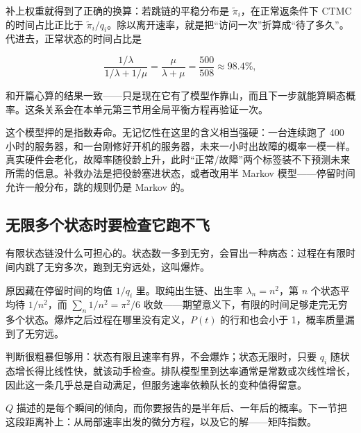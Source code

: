 补上权重就得到了正确的换算：若跳链的平稳分布是 \(\widetilde\pi_i\)，在正常返条件下 CTMC 的时间占比正比于 \(\widetilde\pi_i/q_i\)。除以离开速率，就是把``访问一次''折算成``待了多久''。代进去，正常状态的时间占比是

\[
\frac{1/\lambda}{1/\lambda+1/\mu}=\frac{\mu}{\lambda+\mu}=\frac{500}{508}\approx 98.4\%,
\]

和开篇心算的结果一致——只是现在它有了模型作靠山，而且下一步就能算瞬态概率。这条关系会在本单元第三节用全局平衡方程再验证一次。

这个模型押的是指数寿命。无记忆性在这里的含义相当强硬：一台连续跑了 400 小时的服务器，和一台刚修好开机的服务器，未来一小时出故障的概率一模一样。真实硬件会老化，故障率随役龄上升，此时``正常/故障''两个标签装不下预测未来所需的信息。补救办法是把役龄塞进状态，或者改用半 Markov 模型——停留时间允许一般分布，跳的规则仍是 Markov 的。

\subsection{无限多个状态时要检查它跑不飞}

有限状态链没什么可担心的。状态数一多到无穷，会冒出一种病态：过程在有限时间内跳了无穷多次，跑到无穷远处，这叫爆炸。

原因藏在停留时间的均值 \(1/q_i\) 里。取纯出生链、出生率 \(\lambda_n=n^2\)，第 \(n\) 个状态平均待 \(1/n^2\)，而 \(\sum_n 1/n^2=\pi^2/6\) 收敛——期望意义下，有限的时间足够走完无穷多个状态。爆炸之后过程在哪里没有定义，\(P(t)\) 的行和也会小于 1，概率质量漏到了无穷远。

判断很粗暴但够用：状态有限且速率有界，不会爆炸；状态无限时，只要 \(q_i\) 随状态增长得比线性快，就该动手检查。排队模型里到达率通常是常数或次线性增长，因此这一条几乎总是自动满足，但服务速率依赖队长的变种值得留意。

\(Q\) 描述的是每个瞬间的倾向，而你要报告的是半年后、一年后的概率。下一节把这段距离补上：从局部速率出发的微分方程，以及它的解——矩阵指数。
